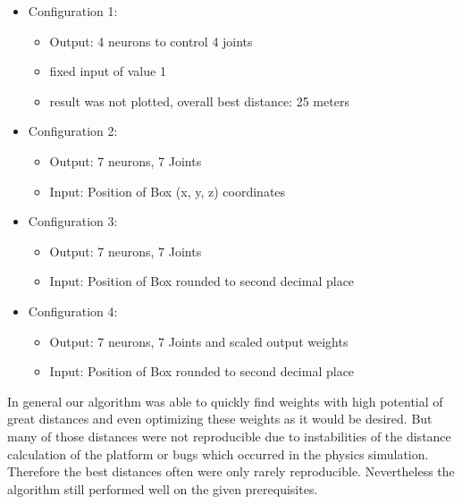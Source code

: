 \begin{itemize}
\item Configuration 1: 
\begin{itemize}
\item Output: 4 neurons to control 4 joints
\item fixed input of value 1
\item result was not plotted, overall best distance: 25 meters
\end{itemize}
\item Configuration 2: 
\begin{itemize}
\item Output: 7 neurons, 7 Joints 
\item Input: Position of Box (x, y, z) coordinates
\end{itemize}
\item Configuration 3: 
\begin{itemize}
\item Output: 7 neurons, 7 Joints 
\item Input: Position of Box rounded to second decimal place
\end{itemize}
\item Configuration 4: 
\begin{itemize}
\item Output: 7 neurons, 7 Joints and scaled output weights 
\item Input: Position of Box rounded to second decimal place
\end{itemize}
\end{itemize}

In general our algorithm was able to quickly find weights with high potential of great distances and even optimizing these weights as it would be desired.
But many of those distances were not reproducible due to instabilities of the distance calculation of the platform or bugs which occurred in the physics simulation. Therefore the best distances often were only rarely reproducible. Nevertheless the algorithm still performed well on the given prerequisites.

